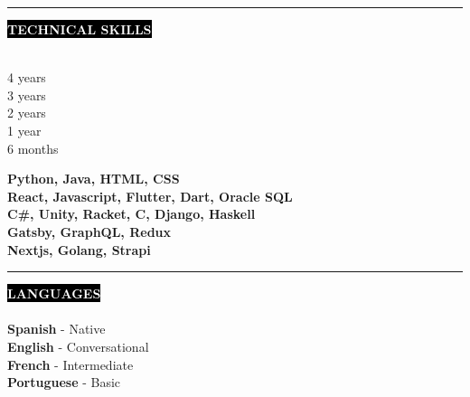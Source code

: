 \documentclass[11pt,A4]{article}
\newcounter{a}
\newcounter{b}
\newcounter{c}
\newcommand{\cvsection}[1] {
	\textcolor{white}{\MakeUppercase{\textbf{#1}}}
}
\newcommand{\cvsect}[1]{
	\colorbox{black}{{\cvsection{#1}}}\\\\%
}
\begin{document}
	\begin{minipage}[t]{0.65\textwidth}\hrule height 0pt width 0pt%
	\cvsect{Technical Skills}
	\begin{minipage}[t]{0.2\textwidth}%
		4 years\\ 3 years \\ 2 years \\ 1 year \\ 6 months
	\end{minipage}%
	\begin{minipage}[t]{0.7\textwidth}%
		\textbf{Python, Java, HTML, CSS} \\ \textbf{React, Javascript, Flutter, Dart, Oracle SQL} \\ \textbf{C\#, Unity, Racket, C, Django, Haskell} \\ \textbf{Gatsby, GraphQL, Redux} \\ \textbf{Nextjs, Golang, Strapi}
	\end{minipage}%
	\end{minipage}%
	\hspace{1cm}
	\begin{minipage}[t]{0.35\textwidth}\hrule height 0pt width 0pt%
		\cvsect{Languages}
		\textbf{Spanish} - Native\\
		\textbf{English} - Conversational\\
		\textbf{French} - Intermediate\\
		\textbf{Portuguese} - Basic\\
	\end{minipage}%
\end{document}
